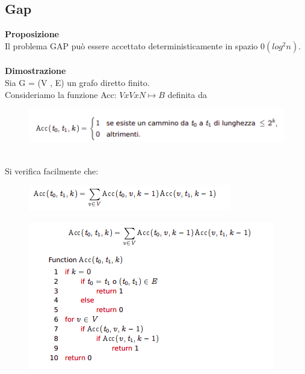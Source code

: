\subsection{Gap}
\textbf{Proposizione}\\
Il problema GAP può essere accettato deterministicamente in spazio $0(log^2 n)$.\\\\
\textbf{Dimostrazione}\\
Sia G = (V , E) un grafo diretto finito.\\
Consideriamo la funzione Acc: $V x V x N \mapsto B$ definita da
\begin{figure}[htp]
    \centering
    \includegraphics[scale=0.9]{tesi_stile/img/foto1cap18.png}
\end{figure}
\\Si verifica facilmente che:
\begin{figure}[htp]
    \centering
    \includegraphics[scale=0.9]{tesi_stile/img/foto2cap18.png}
\end{figure}
\begin{figure}[htp]
    \includegraphics[scale=0.8]{tesi_stile/img/foto3cap18.png}
\end{figure}
\newpage
